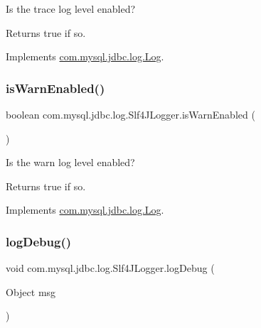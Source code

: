 Is the \textquotesingle{}trace\textquotesingle{} log level enabled?

\begin{DoxyReturn}{Returns}
true if so. 
\end{DoxyReturn}


Implements \mbox{\hyperlink{interfacecom_1_1mysql_1_1jdbc_1_1log_1_1_log_a821407c0c861bbb9de4618617e2fa519}{com.\+mysql.\+jdbc.\+log.\+Log}}.

\mbox{\label{classcom_1_1mysql_1_1jdbc_1_1log_1_1_slf4_j_logger_a8b7c1cc5eeb66fcc771c43645fce5802}} 
\subsubsection{\texorpdfstring{is\+Warn\+Enabled()}{isWarnEnabled()}}
{\footnotesize\ttfamily boolean com.\+mysql.\+jdbc.\+log.\+Slf4\+J\+Logger.\+is\+Warn\+Enabled (\begin{DoxyParamCaption}{ }\end{DoxyParamCaption})}

Is the \textquotesingle{}warn\textquotesingle{} log level enabled?

\begin{DoxyReturn}{Returns}
true if so. 
\end{DoxyReturn}


Implements \mbox{\hyperlink{interfacecom_1_1mysql_1_1jdbc_1_1log_1_1_log_ae786b79391cf28f119aa7b12226b7e2b}{com.\+mysql.\+jdbc.\+log.\+Log}}.

\mbox{\label{classcom_1_1mysql_1_1jdbc_1_1log_1_1_slf4_j_logger_a14878bdfd16f163e96847e3d54a4fa5a}} 
\subsubsection{\texorpdfstring{log\+Debug()}{logDebug()}\hspace{0.1cm}{\footnotesize\ttfamily [1/2]}}
{\footnotesize\ttfamily void com.\+mysql.\+jdbc.\+log.\+Slf4\+J\+Logger.\+log\+Debug (\begin{DoxyParamCaption}\item[{Object}]{msg }\end{DoxyParamCaption})}

